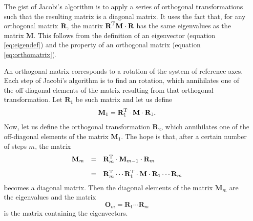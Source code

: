 The gist of Jacobi's algorithm is to apply a series of orthogonal
transformations such that the resulting matrix is a diagonal
matrix. It uses the fact that, for any orthogonal matrix ${\textbf
R}$, the matrix $\textbf{R}^{\mathop\textrm{T}}\textbf{M}\cdot\textbf{R}$ has the same
eigenvalues as the matrix $\textbf{M}$. This follows from the
definition of an eigenvector (equation \ref{eq:eigendef}) and the
property of an orthogonal matrix (equation \ref{eq:orthomatrix}).

An orthogonal matrix corresponds to a rotation of the system of
reference axes. Each step of Jacobi's algorithm is to find an
rotation, which annihilates one of the off-diagonal elements of
the matrix resulting from that orthogonal transformation. Let
$\textbf{R}_1$ be such matrix and let us define
\begin{equation}
  \textbf{M}_1 = \textbf{R}^{\mathop\textrm{T}}_1\cdot\textbf{M}\cdot\textbf{R}_1.
\end{equation}
Now, let us define the orthogonal transformation $\textbf{R}_2$,
which annihilates one of the off-diagonal elements of the matrix
$\textbf{M}_1$. The hope is that, after a certain number of steps
$m$, the matrix
\begin{equation}
  \begin{array}{lcl}
    \textbf{M}_m & = &\textbf{R}^{\mathop\textrm{T}}_m\cdot\textbf{M}_{m-1}\cdot{\textbf
    R}_m\\*[2ex]
      & = &\textbf{R}^{\mathop\textrm{T}}_m\cdots\textbf{R}^{\mathop\textrm{T}}_1\cdot\textbf{M}\cdot{\textbf
      R}_1\cdots\textbf{R}_m
  \end{array}
\end{equation}
becomes a diagonal matrix. Then the diagonal elements of the
matrix $\textbf{M}_m$ are the eigenvalues and the matrix
\begin{equation}
    \textbf{O}_m = \textbf{R}_1\cdots\textbf{R}_m
\end{equation}
is the matrix containing the eigenvectors.

